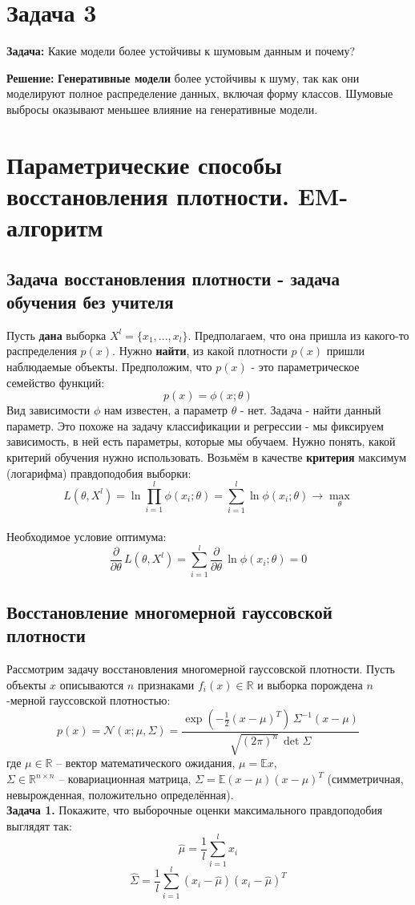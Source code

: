 \section*{Задача 3}
\textbf{Задача:} Какие модели более устойчивы к шумовым данным и почему?

\textbf{Решение:} \textbf{Генеративные модели} более устойчивы к шуму, так как они моделируют полное распределение данных, включая форму классов. Шумовые выбросы оказывают меньшее влияние на генеративные модели.


\section{Параметрические способы восстановления плотности. EM-алгоритм}
\subsection{Задача восстановления плотности - задача обучения без учителя}

Пусть \textbf{дана} выборка $X^l = \{x_1,...,x_l\}$. Предполагаем, что она пришла из какого-то распределения $p(x)$. Нужно \textbf{найти}, из какой плотности  $p(x)$ пришли наблюдаемые объекты. Предположим, что $p(x)$ - это параметрическое семейство функций:
$$p(x) = \phi(x;\theta)$$
Вид зависимости $\phi$ нам известен, а параметр $\theta$ - нет. Задача - найти данный параметр. 
Это похоже на задачу классификации и регрессии - мы фиксируем зависимость, в ней есть параметры, которые мы обучаем. 
Нужно понять, какой критерий обучения нужно использовать.
Возьмём в качестве \textbf{критерия} максимум (логарифма) правдоподобия выборки:
$$L(\theta, X^l) = \ln \prod_{i=1}^l \phi(x_i; \theta) = \sum_{i=1}^l \ln \phi(x_i;\theta) \to \max_\theta $$
\\
Необходимое условие оптимума:
$$\frac{\partial}{\partial \theta} \, L(\theta, X^l) = \sum_{i=1}^l \frac{\partial}{\partial \theta}\,  \ln \phi(x_i;\theta) = 0$$
\subsection{Восстановление многомерной гауссовской плотности}
Рассмотрим задачу восстановления многомерной гауссовской плотности. 
Пусть объекты $x$ описываются $n$ признаками $f_i(x)\in \mathbb{R}$ и выборка порождена $n$-мерной гауссовской плотностью:
$$p(x) = \mathcal{N}(x;\mu,\Sigma) = \frac{\exp(-\frac{1}{2}(x-\mu)^T)\,\Sigma^{-1}(x-\mu)}{\sqrt{(2\pi)^n}\,\det \Sigma}$$
где $\mu\in \mathbb{R}$ -- вектор математического ожидания, $\mu=\mathbb{E}x$,\\ $\Sigma \in \mathbb{R}^{n\times n}$ -- ковариационная матрица, $\Sigma = \mathbb{E}(x-\mu)(x-\mu)^T$ (симметричная, невырожденная, положительно определённая).
\\[\bigskipamount]
\textbf{Задача 1.} Покажите, что выборочные оценки максимального правдоподобия выглядят так:
$$\hat{\mu} = \frac{1}{l} \sum_{i=1}^l x_i$$
$$\hat{\Sigma} = \frac{1}{l}\sum_{i=1}^l (x_i - \hat{\mu})(x_i - \hat{\mu})^T$$
\\[\bigskipamount]

